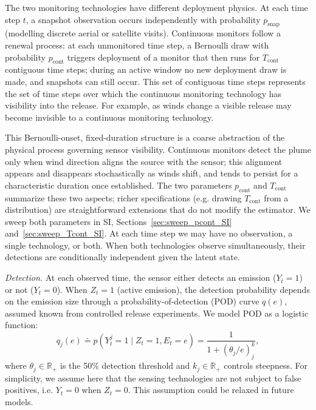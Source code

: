 \documentclass[unnumsec,webpdf,modern,mediumone]{oup-authoring-template}
\newcommand{\new}[1]{{\color{blue}#1}}
\begin{document}
The two monitoring technologies have different deployment physics. At each time step $t$, a snapshot observation occurs independently with probability $p_{\text{snap}}$ (modelling discrete aerial or satellite visits). Continuous monitors follow a renewal process: at each unmonitored time step, a Bernoulli draw with probability $p_{\text{cont}}$ triggers deployment of a monitor that then runs for $T_{\text{cont}}$ contiguous time steps; during an active window no new deployment draw is made, and snapshots can still occur. This set of contiguous time steps represents the set of time steps over which the continuous monitoring technology has visibility into the release. For example, as winds change a visible release may become invisible to a continuous monitoring technology.

\new{This Bernoulli-onset, fixed-duration structure is a coarse abstraction of the physical process governing sensor visibility. Continuous monitors detect the plume only when wind direction aligns the source with the sensor; this alignment appears and disappears stochastically as winds shift, and tends to persist for a characteristic duration once established. The two parameters $p_{\text{cont}}$ and $T_{\text{cont}}$ summarize these two aspects; richer specifications (e.g. drawing $T_{\text{cont}}$ from a distribution) are straightforward extensions that do not modify the estimator. We sweep both parameters in SI, Sections~\ref{sec:sweep_pcont_SI} and~\ref{sec:sweep_Tcont_SI}.} At each time step we may have no observation, a single technology, or both. When both technologies observe simultaneously, their detections are conditionally independent given the latent state.

\textit{Detection.} At each observed time, the sensor either detects an emission ($Y_t = 1$) or not ($Y_t = 0$). When $Z_t=1$ (active emission), the detection probability depends on the emission size through a probability-of-detection (POD) curve $q(e)$, assumed known from controlled release experiments. We model POD as a logistic function:
\begin{equation}
    q_j(e)
    \doteq p(Y^j_t=1\mid Z_t=1,E_t=e) 
    = \frac{1}{1+(\theta_j/e)^k_j},
    \label{eq:pod}
\end{equation}
where $\theta_j \in\mathbb{R}_+$ is the 50\% detection threshold and $k_j\in\mathbb{R}_+$ controls steepness. For simplicity, we assume here that the sensing technologies are not subject to false positives, i.e. $Y_t=0$ when $Z_t=0$. This assumption could be relaxed in future models.
\end{document}
